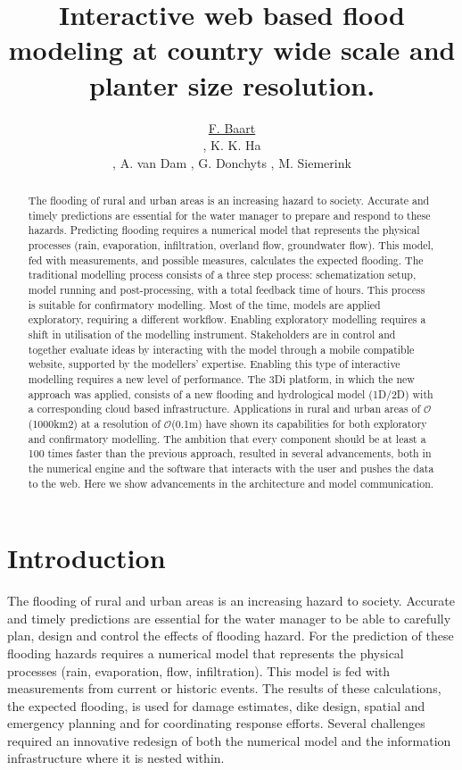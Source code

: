 \documentclass[a4paper]{article}
\title{Interactive web based flood modeling at country wide scale and planter size resolution.}
\author{\underline{F. Baart}
  \address[A1]{\it{Deltares,
      Rotterdamseweg
      Delft, The Netherlands (fedor.baart@deltares.nl, arthur.vandam@deltares.nl, gennadii.donchyts@deltares.nl)}},
  K. K. Ha
  \address[B1]{\it{Nelen \& Schuurmans,
      Zakkendragerssteeg,
      Utrecht, The Netherlands (jack.ha@nelen-schuurmans.nl, martijn.siemerink@nelen-schuurmans.nl)}},
  A. van Dam \addressmark[A1],
  G. Donchyts \addressmark[A1],
  M. Siemerink \addressmark[B1]
}
\DeclareRobustCommand{\orderof}{\ensuremath{\mathcal{O}}}
\DeclareRobustCommand{\threedi}{3Di }
\begin{document}
\sffamily
\sansmath


\begin{abstract}
  The flooding of rural and urban areas is an increasing hazard to society. Accurate and timely predictions are essential for the water manager to prepare and respond to these hazards.
  Predicting flooding requires a numerical model that represents the physical processes (rain, evaporation, infiltration, overland flow, groundwater flow). This model, fed with measurements, and possible measures, calculates the expected flooding.
  The traditional modelling process consists of a three step process: schematization setup, model running and post-processing, with a total feedback time of hours.  This process is suitable for confirmatory modelling. Most of the time, models are applied exploratory, requiring a different workflow.
  Enabling exploratory modelling requires a shift in utilisation of the modelling instrument. Stakeholders are in control and together evaluate ideas by interacting with the model through a mobile compatible website, supported by the modellers’ expertise. Enabling this type of interactive modelling requires a new level of performance.
  The \threedi platform, in which the new approach was applied, consists of a new flooding and hydrological model (1D/2D) with a corresponding cloud based infrastructure. Applications in rural and urban areas of \orderof(1000km2) at a resolution of \orderof(0.1m) have shown its capabilities for both exploratory and confirmatory modelling.
  The ambition that every component should be at least a 100 times faster than the previous approach, resulted in several advancements, both in the numerical engine and the software that interacts with the user and pushes the data to the web. Here we show advancements in the architecture and model communication.

\end{abstract}
\begin{keyword}
\end{keyword}

\maketitle


\section{Introduction}
The flooding of rural and urban areas is an increasing hazard to society. Accurate and timely predictions are essential for the water manager to be able to carefully plan, design and control the effects of flooding hazard.
For the prediction of these flooding hazards requires a numerical model that represents the physical processes (rain, evaporation, flow, infiltration). This model is fed with measurements from current or historic events. The results of these calculations, the expected flooding, is used for damage estimates, dike design, spatial and emergency planning and for coordinating response efforts. Several challenges required an innovative redesign of both the numerical model and the information infrastructure where it is nested within.
\end{document}
